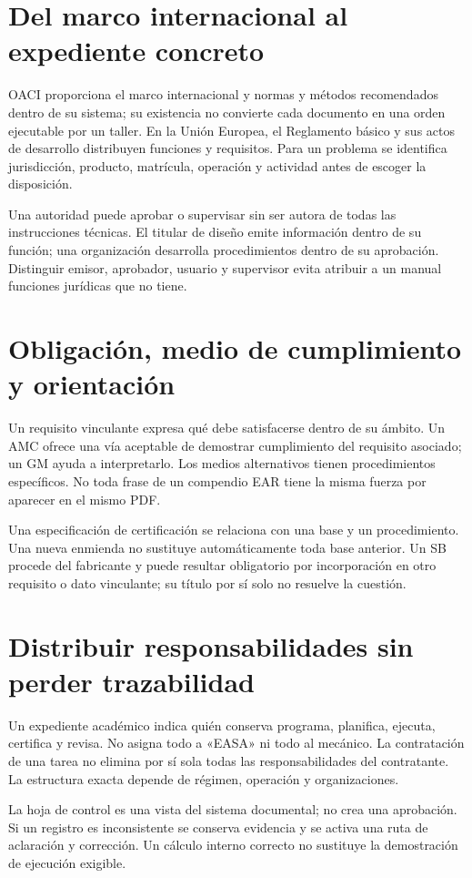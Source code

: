 
\section{Del marco internacional al expediente concreto}
OACI proporciona el marco internacional y normas y métodos recomendados dentro de su sistema; su existencia no convierte cada documento en una orden ejecutable por un taller. En la Unión Europea, el Reglamento básico y sus actos de desarrollo distribuyen funciones y requisitos. Para un problema se identifica jurisdicción, producto, matrícula, operación y actividad antes de escoger la disposición.

Una autoridad puede aprobar o supervisar sin ser autora de todas las instrucciones técnicas. El titular de diseño emite información dentro de su función; una organización desarrolla procedimientos dentro de su aprobación. Distinguir emisor, aprobador, usuario y supervisor evita atribuir a un manual funciones jurídicas que no tiene.
\section{Obligación, medio de cumplimiento y orientación}
Un requisito vinculante expresa qué debe satisfacerse dentro de su ámbito. Un AMC ofrece una vía aceptable de demostrar cumplimiento del requisito asociado; un GM ayuda a interpretarlo. Los medios alternativos tienen procedimientos específicos. No toda frase de un compendio EAR tiene la misma fuerza por aparecer en el mismo PDF.

Una especificación de certificación se relaciona con una base y un procedimiento. Una nueva enmienda no sustituye automáticamente toda base anterior. Un SB procede del fabricante y puede resultar obligatorio por incorporación en otro requisito o dato vinculante; su título por sí solo no resuelve la cuestión.
\section{Distribuir responsabilidades sin perder trazabilidad}
Un expediente académico indica quién conserva programa, planifica, ejecuta, certifica y revisa. No asigna todo a «EASA» ni todo al mecánico. La contratación de una tarea no elimina por sí sola todas las responsabilidades del contratante. La estructura exacta depende de régimen, operación y organizaciones.

La hoja de control es una vista del sistema documental; no crea una aprobación. Si un registro es inconsistente se conserva evidencia y se activa una ruta de aclaración y corrección. Un cálculo interno correcto no sustituye la demostración de ejecución exigible.

